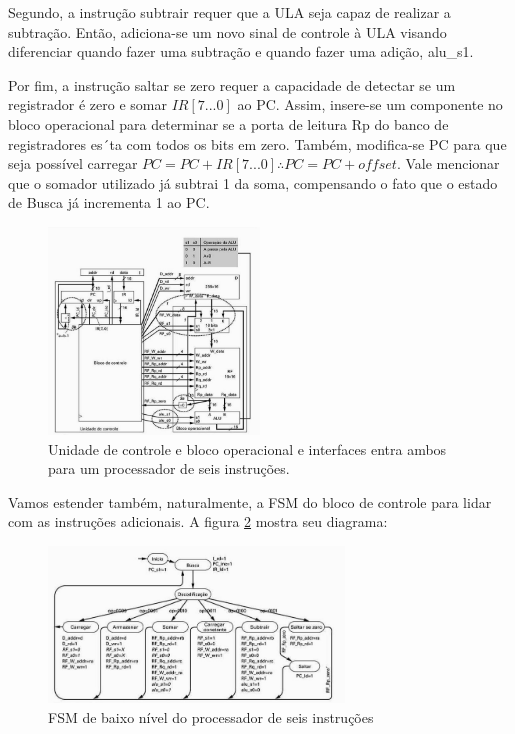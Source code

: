 \documentclass{article}
\begin{document}
Segundo, a instrução subtrair requer que a ULA seja capaz de realizar a subtração. Então, adiciona-se um novo sinal de controle à ULA visando diferenciar quando fazer uma subtração e quando fazer uma adição, alu\_s1.


Por fim, a instrução saltar se zero requer a capacidade de detectar se um registrador é zero e somar $IR[7...0]$ ao PC. Assim, insere-se um componente no bloco operacional para determinar se a porta de leitura Rp do banco de registradores es´ta com todos os bits em zero. Também, modifica-se PC para que seja possível carregar $PC=PC+IR[7...0] \therefore PC=PC+offset$. Vale mencionar que o somador utilizado já subtrai 1 da soma, compensando o fato que o estado de Busca já incrementa 1 ao PC.

\begin{figure}[h!] 
    \centering 
    \includegraphics[width=0.5\textwidth]{operacionalecontrole6instr.jpg} 
    \caption{Unidade de controle e bloco operacional e
interfaces entra ambos para um processador de seis
instruções.} 
    \label{fig:unidadeDeControleBlocoOperacional6Instr} 
\end{figure}


Vamos estender também, naturalmente, a FSM do bloco de controle para lidar com as instruções adicionais. A figura
\ref{fig:fsmBaixoNivel6Instr} mostra seu diagrama:
\begin{figure}[h!] 
    \centering 
    \includegraphics[width=0.7\textwidth]{fsmBaixoNivel6Instr.jpg} 
    \caption{FSM de baixo nível do processador de seis instruções} 
    \label{fig:fsmBaixoNivel6Instr} 
\end{figure}
\end{document}
